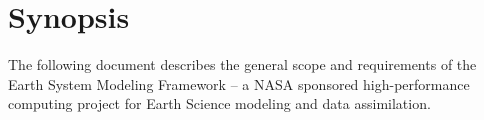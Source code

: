 \section{Synopsis}

The following document describes the general scope and requirements
of the Earth System Modeling Framework -- a NASA sponsored high-performance 
computing project for Earth Science modeling and data assimilation. 







